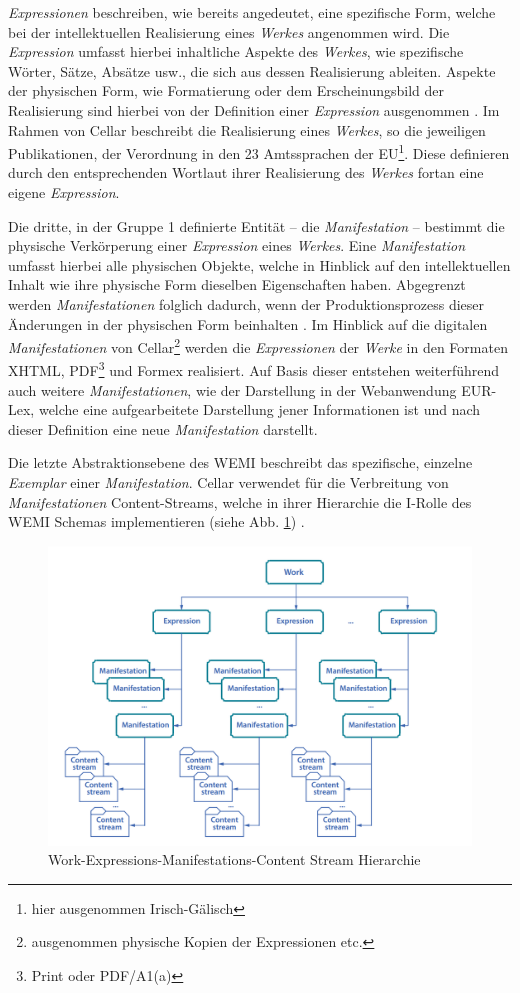     \medskip
    \textit{Expressionen} beschreiben, wie bereits angedeutet, eine spezifische Form, welche bei der intellektuellen Realisierung eines \textit{Werkes} angenommen wird.
    Die \textit{Expression} umfasst hierbei inhaltliche Aspekte des \textit{Werkes}, wie spezifische Wörter, Sätze, Absätze usw., die sich aus dessen Realisierung ableiten. 
    Aspekte der physischen Form, wie Formatierung oder dem Erscheinungsbild der Realisierung sind hierbei von der Definition einer \textit{Expression} ausgenommen \cite[S. 18f]{eu_frbr}.
    Im Rahmen von Cellar beschreibt die Realisierung eines \textit{Werkes}, so die jeweiligen Publikationen, der Verordnung in den 23 Amtssprachen der EU\footnote{hier ausgenommen Irisch-Gälisch}.
    Diese definieren durch den entsprechenden Wortlaut ihrer Realisierung des \textit{Werkes} fortan eine eigene \textit{Expression}.
    
    \medskip
    Die dritte, in der Gruppe 1 definierte Entität -- die \textit{Manifestation} -- bestimmt die physische Verkörperung einer \textit{Expression} eines \textit{Werkes}.
    Eine \textit{Manifestation} umfasst hierbei alle physischen Objekte, welche in Hinblick auf den intellektuellen Inhalt wie ihre physische Form dieselben Eigenschaften haben.
    Abgegrenzt werden \textit{Manifestationen} folglich dadurch, wenn der Produktionsprozess dieser Änderungen in der physischen Form beinhalten \cite[S. 20f]{eu_frbr}.
    Im Hinblick auf die digitalen \textit{Manifestationen} von Cellar\footnote{ausgenommen physische Kopien der Expressionen etc.} werden die \textit{Expressionen} der \textit{Werke} in den Formaten XHTML, PDF\footnote{Print oder PDF/A1(a)} und Formex realisiert. 
    Auf Basis dieser entstehen weiterführend auch weitere \textit{Manifestationen}, wie der Darstellung in der Webanwendung EUR-Lex, welche eine aufgearbeitete Darstellung jener Informationen ist und nach dieser Definition eine neue \textit{Manifestation} darstellt.
    
    
    \medskip
    Die letzte Abstraktionsebene des \acs{WEMI} beschreibt das spezifische, einzelne \textit{Exemplar} einer \textit{Manifestation}. \cite[22]{eu_frbr}
    Cellar verwendet für die Verbreitung von \textit{Manifestationen} Content-Streams, welche in ihrer Hierarchie die I-Rolle des \ac{WEMI} Schemas implementieren (siehe Abb. \ref{fig:eu_wemi}) \cite[29]{eu_cellar}. 
    
    \begin{figure}[H]
        \centering
        \includegraphics[width=0.625\linewidth]{gfx/content_modell.png}
        \caption{Work-Expressions-Manifestations-Content Stream Hierarchie}
        \label{fig:eu_wemi}
    \end{figure}
    
